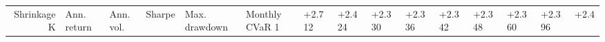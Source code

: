 \begin{tabular}{rlllllll}
\toprule
Shrinkage K & Ann. return & Ann. vol. & Sharpe & Max. drawdown & Monthly CVaR 1%
 & +2.7%
12 & +2.4%
24 & +2.3%
30 & +2.3%
36 & +2.3%
42 & +2.3%
48 & +2.3%
60 & +2.3%
96 & +2.4%
\bottomrule
\end{tabular}
